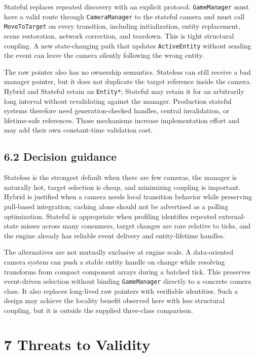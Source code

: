 Stateful replaces repeated discovery with an explicit protocol. \texttt{GameManager} must have a valid route through \texttt{CameraManager} to the stateful camera and must call \texttt{MoveToTarget} on every transition, including initialization, entity replacement, scene restoration, network correction, and teardown. This is tight structural coupling. A new state-changing path that updates \texttt{ActiveEntity} without sending the event can leave the camera silently following the wrong entity.

The raw pointer also has no ownership semantics. Stateless can still receive a bad manager pointer, but it does not duplicate the target reference inside the camera. Hybrid and Stateful retain an \texttt{Entity*}; Stateful may retain it for an arbitrarily long interval without revalidating against the manager. Production stateful systems therefore need generation-checked handles, central invalidation, or lifetime-safe references. Those mechanisms increase implementation effort and may add their own constant-time validation cost.

\subsection{6.2 Decision guidance}

Stateless is the strongest default when there are few cameras, the manager is naturally hot, target selection is cheap, and minimizing coupling is important. Hybrid is justified when a camera needs local transition behavior while preserving pull-based integration; caching alone should not be advertised as a polling optimization. Stateful is appropriate when profiling identifies repeated external-state misses across many consumers, target changes are rare relative to ticks, and the engine already has reliable event delivery and entity-lifetime handles.

The alternatives are not mutually exclusive at engine scale. A data-oriented camera system can push a stable entity handle on change while resolving transforms from compact component arrays during a batched tick. This preserves event-driven selection without binding \texttt{GameManager} directly to a concrete camera class. It also replaces long-lived raw pointers with verifiable identities. Such a design may achieve the locality benefit observed here with less structural coupling, but it is outside the supplied three-class comparison.

\section{7 Threats to Validity}

